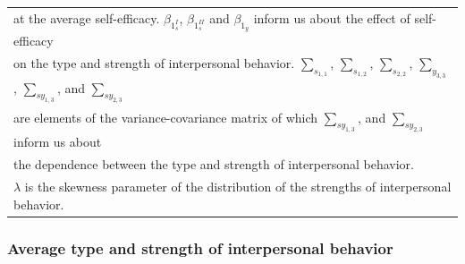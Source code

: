 \documentclass[man]{apa6}
\theoremstyle{definition}
\theoremstyle{definition}
\theoremstyle{definition}
\theoremstyle{remark}
\begin{document}
\begin{table}
\begin{tabular}[t]{lllllll}
\multicolumn{7}{l}{at the average self-efficacy. $\beta_{1_s^{I}}$, $\beta_{1_s^{II}}$ and $\beta_{1_y}$ inform us about the effect of self-efficacy }\\
\multicolumn{7}{l}{on the type and strength of interpersonal behavior. $\sum_{s_{1,1}}$, $\sum_{s_{1,2}}$, $\sum_{s_{2,2}}$, $\sum_{y_{3,3}}$, $\sum_{sy_{1,3}}$,  and $\sum_{sy_{2,3}}$ }\\
\multicolumn{7}{l}{are elements of the variance-covariance matrix of which $\sum_{sy_{1,3}}$,  and $\sum_{sy_{2,3}}$ inform us about}\\
\multicolumn{7}{l}{the dependence between the type and strength of interpersonal behavior.}\\
\multicolumn{7}{l}{$\lambda$ is the skewness parameter of the distribution of the strengths of interpersonal behavior.}\\
\end{tabular}
\end{table}

\subsubsection{Average type and strength of interpersonal behavior}
\end{document}
